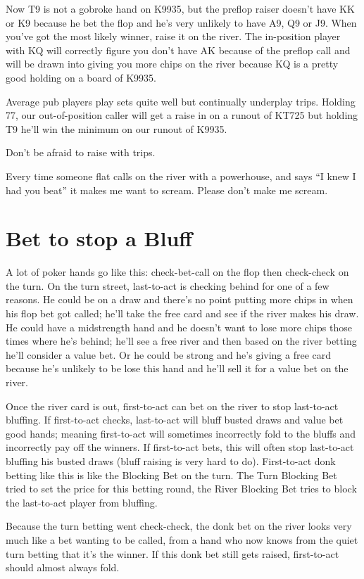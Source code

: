 Now T9 is not a gobroke hand on K9935, but the preflop raiser doesn't
have KK or K9 because he bet the flop and he's very unlikely to have
A9, Q9 or J9. When you've got the most likely winner, raise it on
the river. The in-position player with KQ will correctly figure you
don't have AK because of the preflop call and will be drawn into
giving you more chips on the river because KQ is a pretty good holding
on a board of K9935.

Average pub players play sets quite well but continually underplay
trips. Holding 77, our out-of-position caller will get a raise in on a
runout of KT725 but holding T9 he'll win the minimum on our runout of
K9935.

Don't be afraid to raise with trips.

Every time someone flat calls on the river with a powerhouse, and
says ``I knew I had you beat'' it makes me want to scream. Please
don't make me scream.

\section{Bet to stop a Bluff}

A lot of poker hands go like this: check-bet-call on the flop
then check-check on the turn. On the turn street, last-to-act
is checking behind for one of a few reasons. He could be on a draw
and there's no point putting more chips in when his flop bet got
called; he'll take the free card and see if the river makes his draw.
He could have a midstrength hand and he doesn't want to lose more chips
those times where he's behind; he'll see a free river and then based
on the river betting he'll consider a value bet. Or he could be
strong and he's giving a free card because he's unlikely to be lose
this hand and he'll sell it for a value bet on the river.

Once the river card is out, first-to-act can bet on the river
to stop last-to-act bluffing. If first-to-act checks, last-to-act
will bluff busted draws and value bet good hands; meaning first-to-act
will sometimes incorrectly fold to the bluffs and incorrectly pay
off the winners. If first-to-act bets, this will often
stop last-to-act bluffing his busted draws (bluff raising is
very hard to do). First-to-act donk betting like this is like
the Blocking Bet on the turn. The Turn Blocking Bet tried to set
the price for this betting round, the River Blocking Bet tries
to block the last-to-act player from bluffing.

Because the turn betting went check-check, the donk bet
on the river looks very much like a bet wanting to be called,
from a hand who now knows from the quiet turn betting that it's
the winner. If this donk bet still gets raised, first-to-act
should almost always fold.
